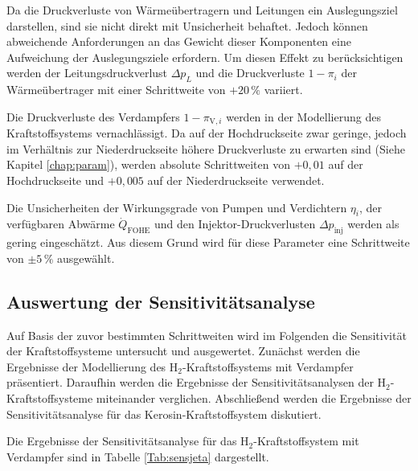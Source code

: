 Da die Druckverluste von Wärmeübertragern und Leitungen ein Auslegungsziel darstellen, sind sie nicht direkt mit Unsicherheit behaftet. Jedoch können abweichende Anforderungen an das Gewicht dieser Komponenten eine Aufweichung der Auslegungsziele erfordern. Um diesen Effekt zu berücksichtigen werden der Leitungsdruckverlust $\Delta p_L$ und die Druckverluste $1-\pi_i$ der Wärmeübertrager mit einer Schrittweite von $+20\,\%$ variiert. 

Die Druckverluste des Verdampfers $1-\pi_{\mathrm{V}, i}$ werden in der Modellierung des Kraftstoffsystems vernachlässigt. Da auf der Hochdruckseite zwar geringe, jedoch im Verhältnis zur Niederdruckseite höhere Druckverluste zu erwarten sind (Siehe Kapitel \ref{chap:param}), werden absolute Schrittweiten von $+0,01$ auf der Hochdruckseite und $+0,005$ auf der Niederdruckseite verwendet. 

Die Unsicherheiten der Wirkungsgrade von Pumpen und Verdichtern $\eta_i$, der verfügbaren Abwärme $\dot{Q}_\mathrm{FOHE}$  und den Injektor-Druckverlusten $\Delta p_\mathrm{inj}$ werden als gering eingeschätzt. Aus diesem Grund wird für diese Parameter eine Schrittweite von $\pm 5\,\%$ ausgewählt.

\subsection{Auswertung der Sensitivitätsanalyse}

Auf Basis der zuvor bestimmten Schrittweiten wird im Folgenden die Sensitivität der Kraftstoffsysteme untersucht und ausgewertet. Zunächst werden die Ergebnisse der Modellierung des H$_2$-Kraftstoffsystems mit Verdampfer präsentiert. Daraufhin werden die Ergebnisse der Sensitivitätsanalysen der H$_2$-Kraftstoffsysteme miteinander verglichen. Abschließend werden die Ergebnisse der Sensitivitätsanalyse für das Kerosin-Kraftstoffsystem diskutiert.

Die Ergebnisse der Sensitivitätsanalyse für das H$_2$-Kraftstoffsystem mit Verdampfer sind in Tabelle \ref{Tab:sensjeta} dargestellt.

